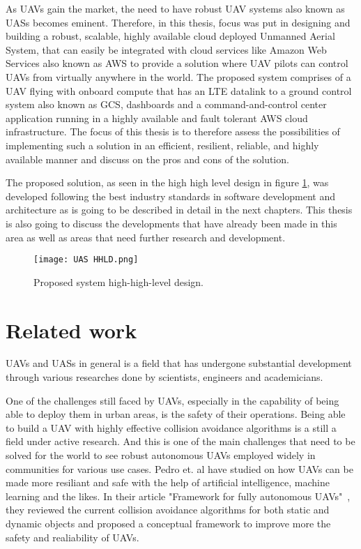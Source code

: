 As UAVs gain the market, the need to have robust UAV systems also known as UASs becomes eminent. Therefore, in this thesis, focus was put in designing and building a robust, scalable, highly available cloud deployed Unmanned Aerial System, that can easily be integrated with cloud services like Amazon Web Services also known as AWS to provide a solution where UAV pilots can control UAVs from virtually anywhere in the world. The proposed system comprises of a UAV flying with onboard compute that has an LTE datalink to a ground control system also known as GCS, dashboards and a command-and-control center application running in a highly available and fault tolerant AWS cloud infrastructure. The focus of this thesis is to therefore assess the possibilities of implementing such a solution in an efficient, resilient, reliable, and highly available manner and discuss on the pros and cons of the solution.

The proposed solution, as seen in the high high level design in figure \ref{fig:uas-hhld}, was developed following the best industry standards in software development and architecture as is going to be described in detail in the next chapters. This thesis is also going to discuss the developments that have already been made in this area as well as areas that need further research and development.

\begin{figure}[!h]
    \centering \texttt{[image: UAS HHLD.png]}
    \caption{Proposed system high-high-level design.}
    \label{fig:uas-hhld}
\end{figure}


\section{Related work}
\label{sec:related-work}

UAVs and UASs in general is a field that has undergone substantial development through various researches done by scientists, engineers and academicians.

One of the challenges still faced by UAVs, especially in the capability of being able to deploy them in urban areas, is the safety of their operations. Being able to build a UAV with highly effective collision avoidance algorithms is a still a field under active research. And this is one of the main challenges that need to be solved for the world to see robust autonomous UAVs employed widely in communities for various use cases. Pedro et. al have studied on how UAVs can be made more resiliant and safe with the help of artificial intelligence, machine learning and the likes. In their article "Framework for fully autonomous UAVs"~\cite{Pedro2020}, they reviewed the current collision avoidance algorithms for both static and dynamic objects and proposed a conceptual framework to improve more the safety and realiability of UAVs.

